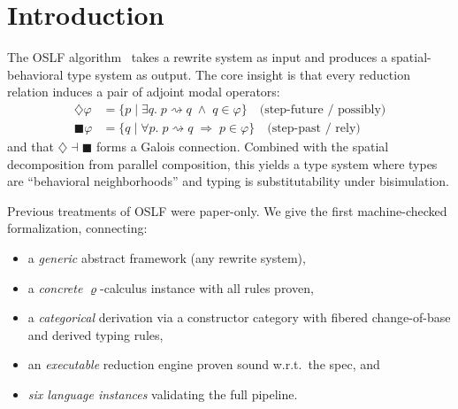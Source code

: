 \documentclass[]{article}
\newcommand{\rhocalc}{\ensuremath{\varrho}}
\newcommand{\Dia}{\ensuremath{\diamondsuit}}
\newcommand{\Bx}{\ensuremath{\blacksquare}}
\newcommand{\OSLF}{\textup{OSLF}}
\begin{document}
\section{Introduction}

The \OSLF{} algorithm~\cite{MeredithStayOSLF2020} takes a rewrite system as input and
produces a spatial-behavioral type system as output.  The core insight is that every
reduction relation induces a pair of adjoint modal operators:
\begin{align}
  \Dia \varphi &= \{ p \mid \exists q.\; p \rightsquigarrow q \;\wedge\; q \in \varphi \}
    \quad\text{(step-future / possibly)} \\
  \Bx \varphi &= \{ q \mid \forall p.\; p \rightsquigarrow q \;\Rightarrow\; p \in \varphi \}
    \quad\text{(step-past / rely)}
\end{align}
and that $\Dia \dashv \Bx$ forms a Galois connection.  Combined with the
spatial decomposition from parallel composition, this yields a type system where types
are ``behavioral neighborhoods'' and typing is substitutability under bisimulation.

Previous treatments of \OSLF{} were paper-only.  We give the first machine-checked
formalization, connecting:
\begin{itemize}
\item a \emph{generic} abstract framework (any rewrite system),
\item a \emph{concrete} \rhocalc{}-calculus instance with all rules proven,
\item a \emph{categorical} derivation via a constructor category with fibered
  change-of-base and derived typing rules,
\item an \emph{executable} reduction engine proven sound w.r.t.\ the spec, and
\item \emph{six language instances} validating the full pipeline.
\end{itemize}
\end{document}

